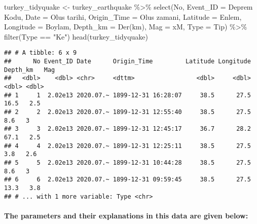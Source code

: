 \documentclass[
]{article}
\newenvironment{Shaded}{\begin{snugshade}}{\end{snugshade}}
\newcommand{\AttributeTok}[1]{\textcolor[rgb]{0.77,0.63,0.00}{#1}}
\newcommand{\FunctionTok}[1]{\textcolor[rgb]{0.00,0.00,0.00}{#1}}
\newcommand{\NormalTok}[1]{#1}
\newcommand{\OtherTok}[1]{\textcolor[rgb]{0.56,0.35,0.01}{#1}}
\newcommand{\SpecialCharTok}[1]{\textcolor[rgb]{0.00,0.00,0.00}{#1}}
\newcommand{\StringTok}[1]{\textcolor[rgb]{0.31,0.60,0.02}{#1}}
\begin{document}
\begin{Shaded}
\begin{Highlighting}[]
\NormalTok{turkey\_tidyquake }\OtherTok{\textless{}{-}}\NormalTok{ turkey\_earthquake }\SpecialCharTok{\%\textgreater{}\%} 
                      \FunctionTok{select}\NormalTok{(No,}
                             \AttributeTok{Event\_ID =} \StringTok{\textasciigrave{}}\AttributeTok{Deprem Kodu}\StringTok{\textasciigrave{}}\NormalTok{,}
                             \AttributeTok{Date =} \StringTok{\textasciigrave{}}\AttributeTok{Olus tarihi}\StringTok{\textasciigrave{}}\NormalTok{,}
                             \AttributeTok{Origin\_Time =} \StringTok{\textasciigrave{}}\AttributeTok{Olus zamani}\StringTok{\textasciigrave{}}\NormalTok{,}
                             \AttributeTok{Latitude =}\NormalTok{ Enlem,}
                             \AttributeTok{Longitude =}\NormalTok{ Boylam,}
                             \AttributeTok{Depth\_km =} \StringTok{\textasciigrave{}}\AttributeTok{Der(km)}\StringTok{\textasciigrave{}}\NormalTok{,}
                             \AttributeTok{Mag =}\NormalTok{ xM,}
                             \AttributeTok{Type =}\NormalTok{ Tip) }\SpecialCharTok{\%\textgreater{}\%} 
                      \FunctionTok{filter}\NormalTok{(Type }\SpecialCharTok{==} \StringTok{"Ke"}\NormalTok{)}
\FunctionTok{head}\NormalTok{(turkey\_tidyquake)}
\end{Highlighting}
\end{Shaded}

\begin{verbatim}
## # A tibble: 6 x 9
##      No Event_ID Date      Origin_Time         Latitude Longitude Depth_km   Mag
##   <dbl>    <dbl> <chr>     <dttm>                 <dbl>     <dbl>    <dbl> <dbl>
## 1     1  2.02e13 2020.07.~ 1899-12-31 16:28:07     38.5      27.5     16.5   2.5
## 2     2  2.02e13 2020.07.~ 1899-12-31 12:55:40     38.5      27.5      8.6   3  
## 3     3  2.02e13 2020.07.~ 1899-12-31 12:45:17     36.7      28.2     67.1   2.5
## 4     4  2.02e13 2020.07.~ 1899-12-31 12:25:11     38.5      27.5      3.8   2.6
## 5     5  2.02e13 2020.07.~ 1899-12-31 10:44:28     38.5      27.5      8.6   3  
## 6     6  2.02e13 2020.07.~ 1899-12-31 09:59:45     38.5      27.5     13.3   3.8
## # ... with 1 more variable: Type <chr>
\end{verbatim}

\hypertarget{the-parameters-and-their-explanations-in-this-data-are-given-below}{%
\paragraph{The parameters and their explanations in this data are given
below:}\label{the-parameters-and-their-explanations-in-this-data-are-given-below}}
\end{document}
